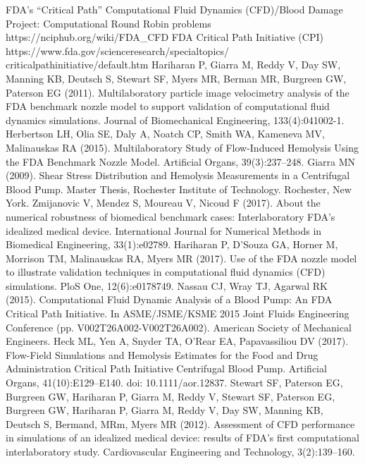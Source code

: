  FDA’s ``Critical Path'' Computational Fluid Dynamics (CFD)/Blood Damage Project: Computational Round Robin problems
https://nciphub.org/wiki/FDA\_CFD
 FDA Critical Path Initiative (CPI) \\https://www.fda.gov/scienceresearch/specialtopics/\\criticalpathinitiative/default.htm
 Hariharan P, Giarra M, Reddy V, Day SW, Manning KB, Deutsch S, Stewart SF, Myers MR, Berman MR, Burgreen GW, Paterson EG (2011). Multilaboratory particle image velocimetry analysis of the FDA benchmark nozzle model to support validation of computational fluid dynamics simulations. Journal of Biomechanical Engineering, 133(4):041002-1.
 Herbertson LH, Olia SE, Daly A, Noatch CP, Smith WA, Kameneva MV, Malinauskas RA (2015). Multilaboratory Study of Flow-Induced Hemolysis Using the FDA Benchmark Nozzle Model. Artificial Organs, 39(3):237--248.
 Giarra MN (2009). Shear Stress Distribution and Hemolysis Measurements in a Centrifugal Blood Pump. Master Thesis, Rochester Institute of Technology. Rochester, New York.
 Zmijanovic V, Mendez S, Moureau V, Nicoud F (2017). About the numerical robustness of biomedical benchmark cases: Interlaboratory FDA's idealized medical device. International Journal for Numerical Methods in Biomedical Engineering, 33(1):e02789.
 Hariharan P, D'Souza GA, Horner M, Morrison TM, Malinauskas RA, Myers MR (2017). Use of the FDA nozzle model to illustrate validation techniques in computational fluid dynamics (CFD) simulations. PloS One, 12(6):e0178749.
 Nassau CJ, Wray TJ, Agarwal RK (2015). Computational Fluid Dynamic Analysis of a Blood Pump: An FDA Critical Path Initiative. In ASME/JSME/KSME 2015 Joint Fluids Engineering Conference (pp. V002T26A002-V002T26A002). American Society of Mechanical Engineers.
 Heck ML, Yen A, Snyder TA, O'Rear EA, Papavassiliou DV (2017). Flow-Field Simulations and Hemolysis Estimates for the Food and Drug Administration Critical Path Initiative Centrifugal Blood Pump. Artificial Organs, 41(10):E129--E140. doi: 10.1111/aor.12837.
 Stewart SF, Paterson EG, Burgreen GW, Hariharan P, Giarra M, Reddy V, Stewart SF, Paterson EG, Burgreen GW, Hariharan P, Giarra M, Reddy V, Day SW, Manning KB, Deutsch S, Bermand, MRm, Myers MR (2012). Assessment of CFD performance in simulations of an idealized medical device: results of FDA's first computational interlaboratory study. Cardiovascular Engineering and Technology, 3(2):139--160.
